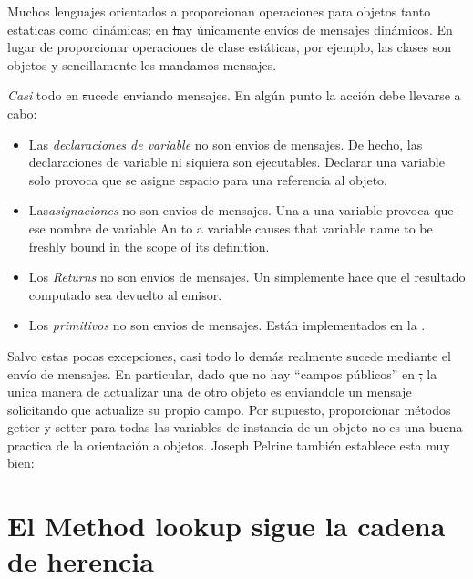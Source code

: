\documentclass[a4paper,10pt,twoside]{book}
\begin{document}

Muchos lenguajes orientados a proporcionan operaciones para objetos tanto estaticas como din\'amicas; en \st hay \'unicamente env\'ios de mensajes din\'amicos. En lugar de proporcionar operaciones de clase est\'aticas, por ejemplo, las clases son objetos y sencillamente les mandamos mensajes.

\emph{Casi} todo en \st sucede enviando mensajes.
En alg\'un punto la acci\'on debe llevarse a cabo:
\begin{itemize}
  \item Las \emph{declaraciones de variable} no son envios de mensajes.
  		De hecho, las declaraciones de variable  ni siquiera son ejecutables.
  		Declarar una variable solo provoca que se asigne espacio para una referencia al objeto.
  \item Las\emph{asignaciones} no son envios de mensajes.
  		Una  a una variable provoca que ese nombre de variable 
		An  to a variable causes that variable name to be freshly bound in the scope of its definition.
  \item Los \emph{Returns} no son envios de mensajes.
  		Un  simplemente hace que el resultado computado sea devuelto al emisor.
  \item Los \emph{primitivos} no son envios de mensajes.
  		Est\'an implementados en la .
\end{itemize}
Salvo estas pocas excepciones, casi todo lo dem\'as realmente sucede mediante el env\'io de mensajes.
En particular, dado que no hay ``campos p\'ublicos'' en \st, la unica manera de actualizar una  de otro objeto es enviandole un mensaje solicitando que actualize su propio campo.
Por supuesto, proporcionar m\'etodos getter y setter para todas las variables de instancia de un objeto no es una buena practica de la orientaci\'on a objetos.
Joseph Pelrine tambi\'en establece esta muy bien:

\section{El Method lookup sigue la cadena de herencia} 
\end{document}
